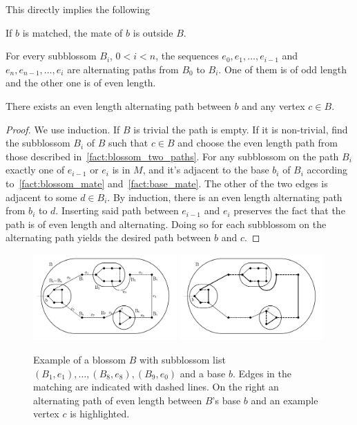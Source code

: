 This directly implies the following

\begin{fact}\label{fact:base_mate}
    If $b$ is matched, the mate of $b$ is outside $B$.
\end{fact}

\begin{fact}\label{fact:blossom_two_paths}
    For every subblossom $B_i$, $0 < i < n$, the sequences $e_0, e_1, \dots, e_{i-1}$ and $e_n, e_{n-1}, \dots, e_i$ are alternating paths from $B_0$ to $B_i$. One of them is of odd length and the other one is of even length.
\end{fact}

\begin{fact}
    There exists an even length alternating path between $b$ and any vertex $c \in B$.

\begin{proof}
    We use induction. If $B$ is trivial the path is empty. If it is non-trivial, find the subblossom $B_i$ of $B$ such that $c \in B$ and choose the even length path from those described in~\ref{fact:blossom_two_paths}. For any subblossom on the path $B_i$ exactly one of $e_{i-1}$ or $e_{i}$ is in $M$, and it's adjacent to the base $b_i$ of $B_i$ according to~\ref{fact:blossom_mate} and~\ref{fact:base_mate}. The other of the two edges is adjacent to some $d \in B_i$. By induction, there is an even length alternating path from $b_i$ to $d$. Inserting said path between $e_{i-1}$ and $e_i$ preserves the fact that the path is of even length and alternating. Doing so for each subblossom on the alternating path yields the desired path between $b$ and $c$.
\end{proof}
\end{fact}

\begin{figure}[b]
    \centering
    \includegraphics*[width=0.49\textwidth]{figures/Basic Blossom.png}
    \includegraphics*[width=0.49\textwidth]{figures/Blossom alternating clean.png}
    \caption{Example of a blossom $B$ with subblossom list $(B_1, e_1), \dots, (B_8, e_8), (B_9, e_0)$ and a base $b$. Edges in the matching are indicated with dashed lines. On the right an alternating path of even length between $B$'s base $b$ and an example vertex $c$ is highlighted.}
\end{figure}

